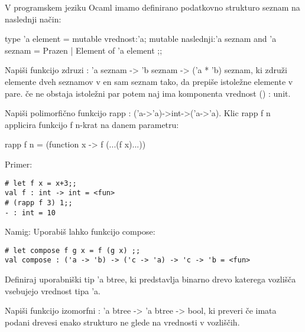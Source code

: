 \begin{ex}
  V programskem jeziku Ocaml imamo definirano podatkovno strukturo
  seznam na naslednji na\v cin:

  type 'a element = { 
     mutable vrednost:'a; 
     mutable naslednji:'a seznam 
  } 
  and 'a seznam = Prazen | Element of 'a element ;; 

  Napi\v si funkcijo zdruzi : 'a seznam -> 'b seznam -> ('a * 'b)
  seznam, ki zdru\v zi elemente dveh seznamov v en sam seznam tako, da
  prepi\v se istole\v zne elemente v pare. \v ce ne obstaja istole\v
  zni par potem naj ima komponenta vrednost () : unit.
\end{ex} 



\begin{ex}
  Napi\v si polimorfi\v cno funkcijo rapp :
  ('a->'a)->int->('a->'a). Klic rapp f n applicira funkcijo f n-krat
  na danem parametru:

  rapp f n = (function x -> f (...(f x)...))     

\noindent\/Primer:            
\begin{lstlisting}
# let f x = x+3;; 
val f : int -> int = <fun> 
# (rapp f 3) 1;; 
- : int = 10 

\end{lstlisting}

Namig: Uporabi\v s lahko funkcijo compose:

\begin{lstlisting}
# let compose f g x = f (g x) ;; 
val compose : ('a -> 'b) -> ('c -> 'a) -> 'c -> 'b = <fun> 
\end{lstlisting}
\end{ex} 



\begin{ex}
  Definiraj uporabni\v ski tip 'a btree, ki predstavlja binarno drevo
  katerega vozli\v s\v ca vsebujejo vrednost tipa 'a.

  Napi\v si funkcijo izomorfni : 'a btree -> 'a btree -> bool, ki
  preveri \v ce imata podani drevesi enako strukturo ne glede na
  vrednosti v vozli\v s\v cih.


\end{ex} 




